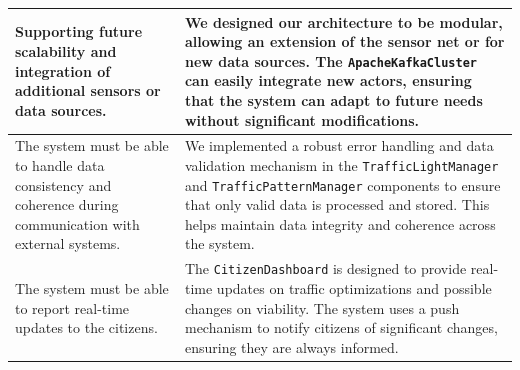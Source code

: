 \documentclass[12pt, a4paper, twoside, openright]{report}
\begin{document}
\begin{longtable}{p{}p{}}
\hline
Supporting future scalability and integration of additional sensors or data sources. & We designed our architecture to be modular, allowing an extension of the sensor net or for new data sources. The \texttt{ApacheKafkaCluster} can easily integrate new actors, ensuring that the system can adapt to future needs without significant modifications. \\
\hline
The system must be able to handle data consistency and coherence during communication with external systems. & We implemented a robust error handling and data validation mechanism in the \texttt{TrafficLightManager} and \texttt{TrafficPatternManager} components to ensure that only valid data is processed and stored. This helps maintain data integrity and coherence across the system. \\
\hline
The system must be able to report real-time updates to the citizens. & The \texttt{CitizenDashboard} is designed to provide real-time updates on traffic optimizations and possible changes on viability. The system uses a push mechanism to notify citizens of significant changes, ensuring they are always informed. \\
\end{longtable}
\end{document}

